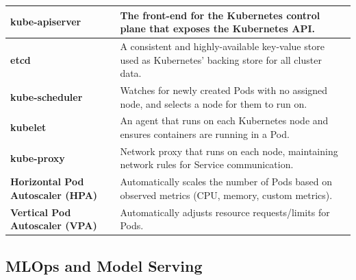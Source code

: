 \documentclass[11pt]{article}
\begin{document}
\begin{longtable}{|p{}|p{}|}
\hline
\textbf{kube-apiserver} & The front-end for the Kubernetes control plane that exposes the Kubernetes API. \\
\hline
\textbf{etcd} & A consistent and highly-available key-value store used as Kubernetes' backing store for all cluster data. \\
\hline
\textbf{kube-scheduler} & Watches for newly created Pods with no assigned node, and selects a node for them to run on. \\
\hline
\textbf{kubelet} & An agent that runs on each Kubernetes node and ensures containers are running in a Pod. \\
\hline
\textbf{kube-proxy} & Network proxy that runs on each node, maintaining network rules for Service communication. \\
\hline
\textbf{Horizontal Pod Autoscaler (HPA)} & Automatically scales the number of Pods based on observed metrics (CPU, memory, custom metrics). \\
\hline
\textbf{Vertical Pod Autoscaler (VPA)} & Automatically adjusts resource requests/limits for Pods. \\
\hline
\end{longtable}

\subsection{MLOps and Model Serving}
\end{document}
